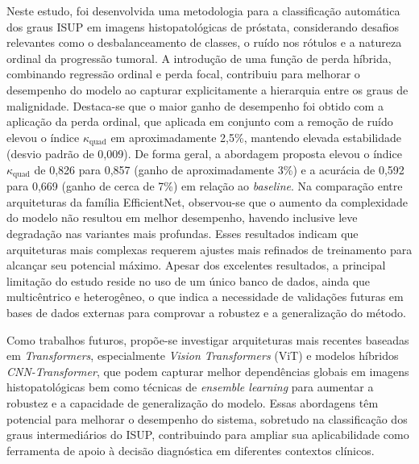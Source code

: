 Neste estudo, foi desenvolvida uma metodologia para a classificação automática dos graus ISUP em imagens histopatológicas de próstata, considerando desafios relevantes como o desbalanceamento de classes, o ruído nos rótulos e a natureza ordinal da progressão tumoral. A introdução de uma função de perda híbrida, combinando regressão ordinal e perda focal, contribuiu para melhorar o desempenho do modelo ao capturar explicitamente a hierarquia entre os graus de malignidade. Destaca-se que o maior ganho de desempenho foi obtido com a aplicação da perda ordinal, que aplicada em conjunto com a remoção de ruído elevou o índice $\kappa_{\text{quad}}$ em aproximadamente 2,5\%, mantendo elevada estabilidade (desvio padrão de 0,009). De forma geral, a abordagem proposta elevou o índice $\kappa_{\text{quad}}$ de 0,826 para 0,857 (ganho de aproximadamente 3\%) e a acurácia de 0,592 para 0,669 (ganho de cerca de 7\%) em relação ao \textit{baseline}. Na comparação entre arquiteturas da família EfficientNet, observou-se que o aumento da complexidade do modelo não resultou em melhor desempenho, havendo inclusive leve degradação nas variantes mais profundas. Esses resultados indicam que arquiteturas mais complexas requerem ajustes mais refinados de treinamento para alcançar seu potencial máximo. Apesar dos excelentes resultados, a principal limitação do estudo reside no uso de um único banco de dados, ainda que multicêntrico e heterogêneo, o que indica a necessidade de validações futuras em bases de dados externas para comprovar a robustez e a generalização do método.


Como trabalhos futuros, propõe-se investigar arquiteturas mais recentes baseadas em \textit{Transformers}, especialmente \textit{Vision Transformers} (ViT) e modelos híbridos \textit{CNN-Transformer}, que podem capturar melhor dependências globais em imagens histopatológicas bem como técnicas de \textit{ensemble learning} para aumentar a robustez e a capacidade de generalização do modelo. Essas abordagens têm potencial para melhorar o desempenho do sistema, sobretudo na classificação dos graus intermediários do ISUP, contribuindo para ampliar sua aplicabilidade como ferramenta de apoio à decisão diagnóstica em diferentes contextos clínicos.
